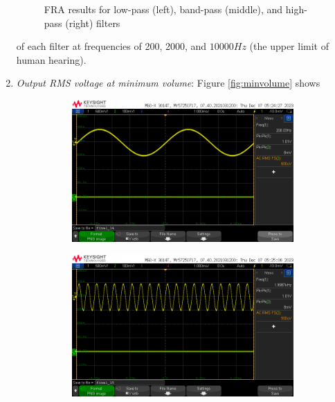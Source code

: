 \documentclass[notitlepage, 12pt]{report}
\begin{document}
\begin{enumerate}
\begin{figure}
        \caption{FRA results for low-pass (left), band-pass (middle), and high-pass (right) filters}
        \label{fig:frafilters}
    \end{figure}
    of each filter at frequencies of 200, 2000, and $10000Hz$ (the upper limit of human hearing).
    \item \emph{Output RMS voltage at minimum volume}: Figure \ref{fig:minvolume} shows 
    \begin{figure}    
        \begin{subfigure}{0.3\textwidth}
            \includegraphics[scale=0.2]{images/minvollow.png}
        \end{subfigure}
        \hfill
        \begin{subfigure}{0.3\textwidth}
            \includegraphics[scale=0.2]{images/minvolmed.png}
        \end{subfigure}
        \hfill
        \begin{subfigure}{0.3\textwidth}

\end{subfigure}
\end{figure}
\end{enumerate}
\end{document}
